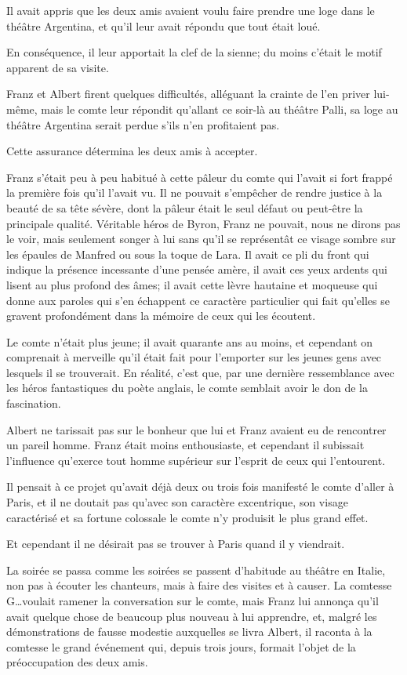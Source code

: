 Il avait appris que les deux amis avaient voulu faire prendre une loge dans le théâtre Argentina, et qu'il leur avait répondu que tout était loué. 

En conséquence, il leur apportait la clef de la sienne; du moins c'était le motif apparent de sa visite. 

Franz et Albert firent quelques difficultés, alléguant la crainte de l'en priver lui-même, mais le comte leur répondit qu'allant ce soir-là au théâtre Palli, sa loge au théâtre Argentina serait perdue s'ils n'en profitaient pas. 

Cette assurance détermina les deux amis à accepter. 

Franz s'était peu à peu habitué à cette pâleur du comte qui l'avait si fort frappé la première fois qu'il l'avait vu. Il ne pouvait s'empêcher de rendre justice à la beauté de sa tête sévère, dont la pâleur était le seul défaut ou peut-être la principale qualité. Véritable héros de Byron, Franz ne pouvait, nous ne dirons pas le voir, mais seulement songer à lui sans qu'il se représentât ce visage sombre sur les épaules de Manfred ou sous la toque de Lara. Il avait ce pli du front qui indique la présence incessante d'une pensée amère, il avait ces yeux ardents qui lisent au plus profond des âmes; il avait cette lèvre hautaine et moqueuse qui donne aux paroles qui s'en échappent ce caractère particulier qui fait qu'elles se gravent profondément dans la mémoire de ceux qui les écoutent.  

Le comte n'était plus jeune; il avait quarante ans au moins, et cependant on comprenait à merveille qu'il était fait pour l'emporter sur les jeunes gens avec lesquels il se trouverait. En réalité, c'est que, par une dernière ressemblance avec les héros fantastiques du poète anglais, le comte semblait avoir le don de la fascination. 

Albert ne tarissait pas sur le bonheur que lui et Franz avaient eu de rencontrer un pareil homme. Franz était moins enthousiaste, et cependant il subissait l'influence qu'exerce tout homme supérieur sur l'esprit de ceux qui l'entourent. 

Il pensait à ce projet qu'avait déjà deux ou trois fois manifesté le comte d'aller à Paris, et il ne doutait pas qu'avec son caractère excentrique, son visage caractérisé et sa fortune colossale le comte n'y produisit le plus grand effet. 

Et cependant il ne désirait pas se trouver à Paris quand il y viendrait. 

La soirée se passa comme les soirées se passent d'habitude au théâtre en Italie, non pas à écouter les chanteurs, mais à faire des visites et à causer. La comtesse G\dots voulait ramener la conversation sur le comte, mais Franz lui annonça qu'il avait quelque chose de beaucoup plus nouveau à lui apprendre, et, malgré les démonstrations de fausse modestie auxquelles se livra Albert, il raconta à la comtesse le grand événement qui, depuis trois jours, formait l'objet de la préoccupation des deux amis.  

